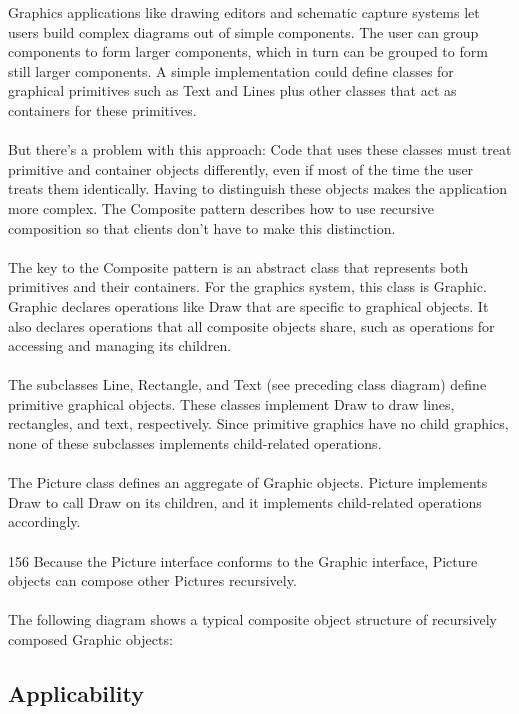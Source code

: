 Graphics applications like drawing editors and schematic capture systems let users build complex diagrams out of simple components. The user can group components to form larger components, which in turn can be grouped to form still larger components. A simple implementation could define classes for graphical primitives such as Text and Lines plus other classes that act as containers for these primitives.
\\\\
But there's a problem with this approach: Code that uses these classes must treat primitive and container objects differently, even if most of the time the user treats them identically. Having to distinguish these objects makes the application more complex. The Composite pattern describes how to use recursive composition so that clients don't have to make this distinction.
\\\\
The key to the Composite pattern is an abstract class that represents both primitives and their containers. For the graphics system, this class is Graphic. Graphic declares operations like Draw that are specific to graphical objects. It also declares operations that all composite objects share, such as operations for accessing and managing its children.
\\\\
The subclasses Line, Rectangle, and Text (see preceding class diagram) define primitive graphical objects. These classes implement Draw to draw lines, rectangles, and text, respectively. Since primitive graphics have no child graphics, none of these subclasses implements child-related operations.
\\\\
The Picture class defines an aggregate of Graphic objects. Picture implements Draw to call Draw on its children, and it implements child-related operations accordingly.
\\\\
156
Because the Picture interface conforms to the Graphic interface, Picture objects can compose other Pictures recursively.
\\\\
The following diagram shows a typical composite object structure of recursively composed Graphic objects:

\subsection*{Applicability}

